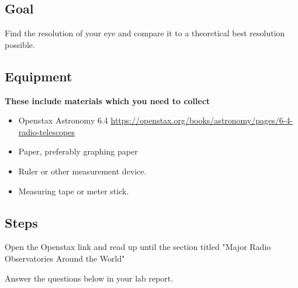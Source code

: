 \subsection{Goal}

Find the resolution of your eye and compare it to a theoretical best resolution possible.

\subsection{Equipment}
\textbf{These include materials which you need to collect}
\begin{itemize}
	\item Openstax Astronomy 6.4 \url{https://openstax.org/books/astronomy/pages/6-4-radio-telescopes}

	\item Paper, preferably graphing paper
	
	\item Ruler or other measurement device. 
	
	\item Measuring tape or meter stick. 
\end{itemize}

\subsection{Steps}

\begin{steps}
	\item Open the Openstax link and read up until the section titled  "Major Radio Observatories Around the World" 
	 \item Answer the questions below in your lab report.
\end{steps}




